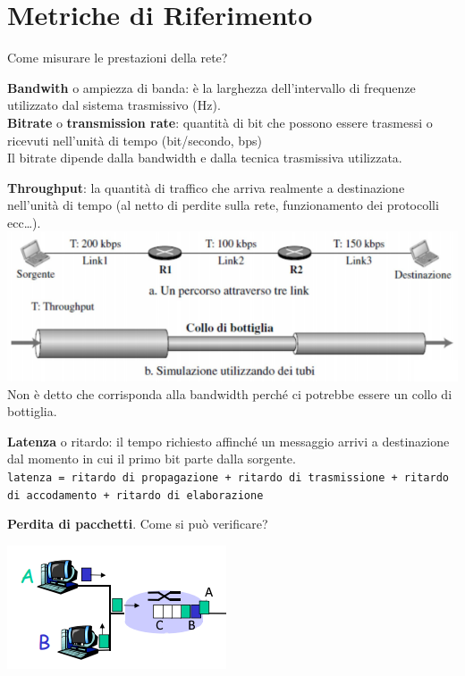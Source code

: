 \documentclass[10pt]{article}
\begin{document}
\section{Metriche di Riferimento}
Come misurare le prestazioni della rete?
\begin{list}{}{Tramite una serie di metriche:}
\item \textbf{Bandwith} o ampiezza di banda: è la larghezza dell'intervallo di frequenze utilizzato dal sistema trasmissivo (Hz).\\\textbf{Bitrate} o \textbf{transmission rate}: quantità di bit che possono essere trasmessi o ricevuti nell'unità di tempo (bit/secondo, bps)\\Il bitrate dipende dalla bandwidth e dalla tecnica trasmissiva utilizzata.
\item \textbf{Throughput}: la quantità di traffico che arriva realmente a destinazione nell'unità di tempo (al netto di perdite sulla rete, funzionamento dei protocolli ecc\ldots).\\\includegraphics[scale=1]{throughput.png}\\Non è detto che corrisponda alla bandwidth perché ci potrebbe essere un collo di bottiglia.
\item \textbf{Latenza} o ritardo: il tempo richiesto affinché un messaggio arrivi a destinazione dal momento in cui il primo bit parte dalla sorgente.\\
\texttt{latenza = ritardo di propagazione + ritardo di trasmissione + ritardo di accodamento + ritardo di elaborazione}
\item \textbf{Perdita di pacchetti}. Come si può verificare?\\
\begin{multicols}{2}
\includegraphics[scale=1]{ritpackets.png}\\


\end{multicols}
\end{list}
\end{document}
